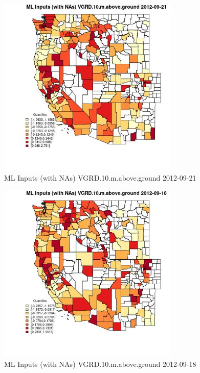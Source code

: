 \begin{figure} 
\centering  
\includegraphics[width=0.77\textwidth]{Code_Outputs/Report_ML_input_PM25_Step4_part_e_de_duplicated_aves_compiled_2019-05-14wNAs_CountyVGRD10mabovegroundMean2012-09-21_2012-09-21.jpg} 
\caption{\label{fig:Report_ML_input_PM25_Step4_part_e_de_duplicated_aves_compiled_2019-05-14wNAsCountyVGRD10mabovegroundMean2012-09-21_2012-09-21}ML Inputs (with NAs) VGRD.10.m.above.ground 2012-09-21} 
\end{figure} 
 

\begin{figure} 
\centering  
\includegraphics[width=0.77\textwidth]{Code_Outputs/Report_ML_input_PM25_Step4_part_e_de_duplicated_aves_compiled_2019-05-14wNAs_CountyVGRD10mabovegroundMean2012-09-18_2012-09-18.jpg} 
\caption{\label{fig:Report_ML_input_PM25_Step4_part_e_de_duplicated_aves_compiled_2019-05-14wNAsCountyVGRD10mabovegroundMean2012-09-18_2012-09-18}ML Inputs (with NAs) VGRD.10.m.above.ground 2012-09-18} 
\end{figure} 
 

